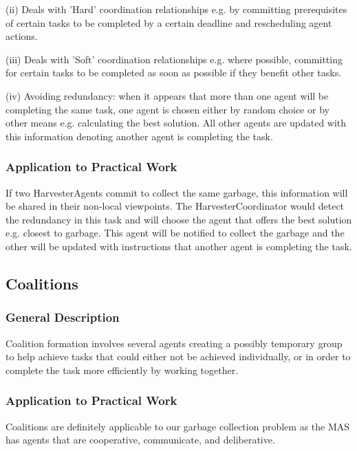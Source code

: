 (ii) Deals with 'Hard' coordination relationships e.g. by committing prerequisites of certain tasks to be completed by a certain deadline and rescheduling agent actions. 

(iii) Deals with 'Soft' coordination relationships e.g. where possible, committing for certain tasks to be completed as soon as possible if they benefit other tasks. 

(iv) Avoiding redundancy:  when it appears that more than one agent will be completing the same task, one agent is chosen either by random choice or by other means e.g. calculating the best solution. All other agents are updated with this information denoting another agent is completing the task. 

\subsubsection{Application to Practical Work}

If two HarvesterAgents commit to collect the same garbage, this information will be shared in their non-local viewpoints. The HarvesterCoordinator would detect the redundancy in this task and will choose the agent that offers the best solution e.g. closest to garbage.  This agent will be notified to collect the garbage and the other will be updated with instructions that another agent is completing the task. 





\subsection{Coalitions}

\subsubsection{General Description}

Coalition formation involves several agents creating a possibly temporary group to help achieve tasks that could either not be achieved individually, or in order to complete the task more efficiently by working together.

\subsubsection{Application to Practical Work}

Coalitions are definitely applicable to our garbage collection problem as the MAS has agents that are cooperative, communicate, and deliberative.
 
